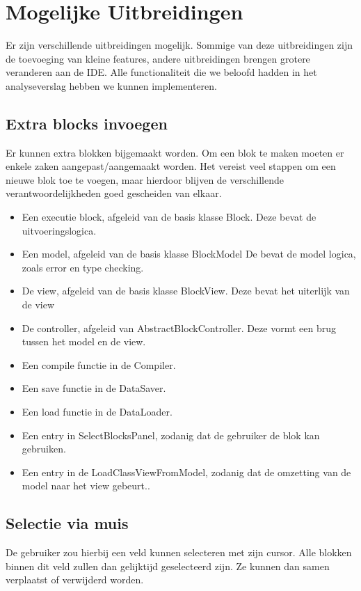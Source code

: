 \documentclass[]{article}
\begin{document}
\section{Mogelijke Uitbreidingen}
\label{uitbreidingen}
Er zijn verschillende uitbreidingen mogelijk. Sommige van deze uitbreidingen zijn de toevoeging van kleine features, andere uitbreidingen brengen grotere veranderen aan de IDE. Alle functionaliteit die we beloofd hadden in het analyseverslag hebben we kunnen implementeren. 

\subsection{Extra blocks invoegen}
Er kunnen extra blokken bijgemaakt worden. Om een blok te maken moeten er enkele zaken aangepast/aangemaakt worden. Het vereist veel stappen om een nieuwe blok toe te voegen, maar hierdoor blijven de verschillende verantwoordelijkheden goed gescheiden van elkaar.
\begin{itemize}
\item Een executie block, afgeleid van de basis klasse Block.
		Deze bevat de uitvoeringslogica.
\item Een model, afgeleid van de basis klasse BlockModel
		De bevat de model logica, zoals error en type checking.
\item De view,  afgeleid van de basis klasse BlockView. Deze bevat het uiterlijk van de view
\item De controller, afgeleid van AbstractBlockController. Deze vormt een brug tussen het model en de view.
\item Een compile functie in de Compiler.
\item Een save functie in de DataSaver.
\item Een load functie in de DataLoader.
\item Een entry in SelectBlocksPanel, zodanig dat de gebruiker de blok kan gebruiken.
\item Een entry in de LoadClassViewFromModel, zodanig dat de omzetting van de model naar het view gebeurt..
\end{itemize}

\subsection{Selectie via muis}
De gebruiker zou hierbij een veld kunnen selecteren met zijn cursor. Alle blokken binnen dit veld zullen dan gelijktijd geselecteerd zijn. Ze kunnen dan samen verplaatst of verwijderd worden.
\end{document}
